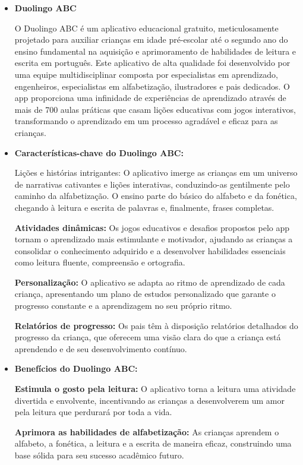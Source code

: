 \begin{itemize}
    \item \textbf{Duolingo ABC}

O Duolingo ABC é um aplicativo educacional gratuito, meticulosamente projetado para auxiliar crianças em idade pré-escolar até o segundo ano do ensino fundamental na aquisição e aprimoramento de habilidades de leitura e escrita em português. Este aplicativo de alta qualidade foi desenvolvido por uma equipe multidisciplinar composta por especialistas em aprendizado, engenheiros, especialistas em alfabetização, ilustradores e pais dedicados. O app proporciona uma infinidade de experiências de aprendizado através de mais de 700 aulas práticas que casam lições educativas com jogos interativos, transformando o aprendizado em um processo agradável e eficaz para as crianças. 

    \item \textbf{Características-chave do Duolingo ABC:}

Lições e histórias intrigantes: O aplicativo imerge as crianças em um universo de narrativas cativantes e lições interativas, conduzindo-as gentilmente pelo caminho da alfabetização. O ensino parte do básico do alfabeto e da fonética, chegando à leitura e escrita de palavras e, finalmente, frases completas.

\textbf{Atividades dinâmicas:} Os jogos educativos e desafios propostos pelo app tornam o aprendizado mais estimulante e motivador, ajudando as crianças a consolidar o conhecimento adquirido e a desenvolver habilidades essenciais como leitura fluente, compreensão e ortografia.

\textbf{Personalização: } O aplicativo se adapta ao ritmo de aprendizado de cada criança, apresentando um plano de estudos personalizado que garante o progresso constante e a aprendizagem no seu próprio ritmo.

\textbf{Relatórios de progresso:} Os pais têm à disposição relatórios detalhados do progresso da criança, que oferecem uma visão clara do que a criança está aprendendo e de seu desenvolvimento contínuo.


\item \textbf{Benefícios do Duolingo ABC:}

\textbf{Estimula o gosto pela leitura:} O aplicativo torna a leitura uma atividade divertida e envolvente, incentivando as crianças a desenvolverem um amor pela leitura que perdurará por toda a vida.

\textbf{Aprimora as habilidades de alfabetização:} As crianças aprendem o alfabeto, a fonética, a leitura e a escrita de maneira eficaz, construindo uma base sólida para seu sucesso acadêmico futuro.


\end{itemize}
